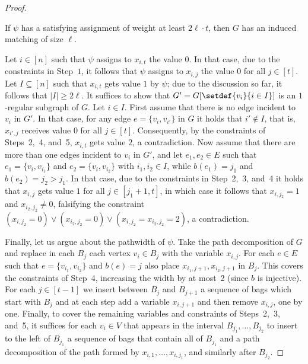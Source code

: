 \begin{proof}
    \begin{claim}
        If $\psi$ has a satisfying assignment of weight at least $2\ell \cdot t$,
        then $G$ has an induced matching of size $\ell$.
    \end{claim}

    \begin{claimproof}
        Let $i \in [n]$ such that $\psi$ assigns to $x_{i,t}$ the value $0$.
        In that case, due to the constraints in Step~$1$, it follows that $\psi$ assigns to
        $x_{i,j}$ the value $0$ for all $j \in [t]$.
        Let $I \subseteq [n]$ such that $x_{i,t}$ gets value $1$ by $\psi$;
        due to the discussion so far, it follows that $|I| \ge 2\ell$.
        It suffices to show that $G' = G[\setdef{v_i}{i \in I}]$ is an $1$-regular subgraph of $G$.
        Let $i \in I$.
        First assume that there is no edge incident to $v_i$ in $G'$.
        In that case, for any edge $e = \{ v_i, v_{i'} \}$ in $G$ it holds that
        $i' \notin I$, that is, $x_{i',j}$ receives value $0$ for all $j \in [t]$.
        Consequently, by the constraints of Steps~2,~4, and~5, $x_{i,t}$ gets value $2$, a contradiction.
        Now assume that there are more than one edges incident to $v_i$ in $G'$,
        and let $e_1,e_2 \in E$ such that $e_1 = \{v_i, v_{i_1}\}$ and $e_2 = \{v_i, v_{i_2}\}$ with $i_1,i_2 \in I$,
        while $b(e_1) = j_1$ and $b(e_2) = j_2 > j_1$.
        In that case, due to the constraints in Step~2,~3, and~4 it holds that
        $x_{i,j}$ gets value $1$ for all $j \in [j_1+1,t]$,
        in which case it follows that $x_{i,j_2} = 1$ and $x_{i_2,j_2} \neq 0$,
        falsifying the constraint $(x_{i,j_2} = 0) \lor (x_{i_2,j_2} = 0) \lor (x_{i,j_2} = x_{i_2,j_2} = 2)$,
        a contradiction.
    \end{claimproof}

    Finally, let us argue about the pathwidth of $\psi$.
    Take the path decomposition of $G$ and replace in each $B_j$ each vertex $v_i \in B_j$ with the variable $x_{i,j}$.
    For each $e \in E$ such that $e = \{v_{i_1}, v_{i_2}\}$ and $b(e)=j$ also place
    $x_{i_1,j+1}, x_{i_2,j+1}$ in $B_j$.
    This covers the constraints of Step~4,
    increasing the width by at most~2 (since $b$ is injective).
    For each $j \in [t-1]$ we insert between $B_j$ and $B_{j+1}$ a sequence of bags which start with
    $B_j$ and at each step add a variable $x_{i,j+1}$ and then remove $x_{i,j}$, one by one.
    Finally, to cover the remaining variables and constraints of Steps~2,~3, and~5,
    it suffices for each $v_i \in V$ that appears in the interval $B_{j_1}, \ldots, B_{j_2}$ to insert
    to the left of $B_{j_1}$ a sequence of bags that contain all of $B_{j_1}$ and a path decomposition of the path formed
    by $x_{i,1}, \ldots, x_{i,j_1}$, and similarly after $B_{j_2}$.
\end{proof}


